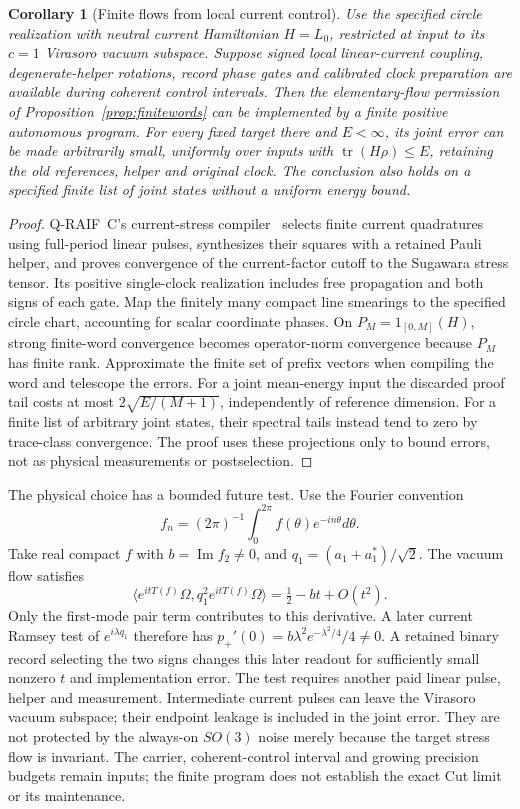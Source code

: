 \documentclass[12pt]{article}
\newtheorem{corollary}[theorem]{Corollary}
\theoremstyle{definition}
\theoremstyle{remark}
\begin{document}
\begin{corollary}[Finite flows from local current control]
\label{cor:physical-finite-stress}
Use the specified circle realization with neutral current Hamiltonian
\(H=L_0\), restricted at input to its \(c=1\) Virasoro vacuum subspace.
Suppose signed local linear-current coupling, degenerate-helper
rotations, record phase gates and calibrated clock preparation are
available during coherent control intervals. Then the elementary-flow
permission of Proposition~\ref{prop:finitewords} can be implemented
by a finite positive autonomous program. For every fixed target there
and \(E<\infty\), its joint error can be made arbitrarily small,
uniformly over inputs with \(\operatorname{tr}(H\rho)\le E\), retaining
the old references, helper and original clock. The conclusion also
holds on a specified finite list of joint states without a uniform
energy bound.
\end{corollary}
\begin{proof}
Q-RAIF~C's current-stress compiler~\cite{QRC} selects finite current
quadratures using full-period linear pulses, synthesizes their
squares with a retained Pauli helper, and proves convergence of the
current-factor cutoff to the Sugawara stress tensor. Its positive
single-clock realization includes free propagation and both signs
of each gate. Map the finitely many compact line smearings to the
specified circle chart, accounting for scalar coordinate phases.
On \(P_M=1_{[0,M]}(H)\), strong finite-word convergence becomes
operator-norm convergence because \(P_M\) has finite rank.
Approximate the finite set of prefix vectors when compiling the
word and telescope the errors. For a joint mean-energy input the
discarded proof tail costs at most \(2\sqrt{E/(M+1)}\), independently
of reference dimension. For a finite list of arbitrary joint states,
their spectral tails instead tend to zero by trace-class convergence.
The proof uses these projections only to bound errors, not as physical
measurements or postselection.
\end{proof}

The physical choice has a bounded future test. Use the Fourier convention
\[
 f_n=(2\pi)^{-1}\int_0^{2\pi} f(\theta)e^{-in\theta}d\theta.
\]
Take real compact \(f\) with \(b=\operatorname{Im}f_2\ne0\), and
\(q_1=(a_1+a_1^*)/\sqrt2\). The vacuum flow satisfies
\[
 \langle e^{itT(f)}\Omega,q_1^2e^{itT(f)}\Omega\rangle
       =\tfrac12-bt+O(t^2).
\]
Only the first-mode pair term contributes to this derivative.
A later current Ramsey test of \(e^{i\lambda q_1}\) therefore has
\(p_+'(0)=b\lambda^2e^{-\lambda^2/4}/4\ne0\).
A retained binary record selecting the two signs changes this later
readout for sufficiently small nonzero \(t\) and implementation error.
The test requires another paid linear pulse, helper and measurement.
Intermediate current pulses can leave the Virasoro vacuum subspace;
their endpoint leakage is included in the joint error. They are not
protected by the always-on \(SO(3)\) noise merely because the target
stress flow is invariant. The carrier, coherent-control interval and
growing precision budgets remain inputs; the finite program does not
establish the exact Cut limit or its maintenance.
\end{document}
